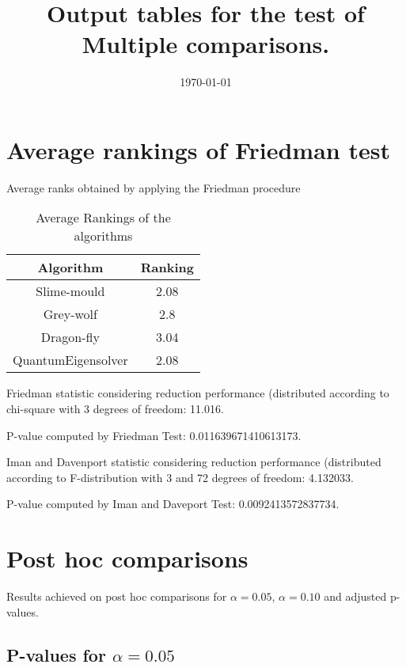 \documentclass[a4paper,10pt]{article}
\title{Output tables for the test of Multiple comparisons.}
\author{}
\date{\today}
\begin{document}
\begin{landscape}
\pagestyle{empty}
\maketitle
\thispagestyle{empty}
\section{Average rankings of Friedman test}



Average ranks obtained by applying the Friedman procedure

\begin{table}[!htp]
\centering
\begin{tabular}{|c|c|}\hline
Algorithm&Ranking\\\hline
Slime-mould & 2.08\\
Grey-wolf & 2.8\\
Dragon-fly & 3.04\\
QuantumEigensolver & 2.08\\
\hline
\end{tabular}
\caption{Average Rankings of the algorithms}
\end{table}

Friedman statistic considering reduction performance (distributed according to chi-square with 3 degrees of freedom: 11.016.

P-value computed by Friedman Test: 0.011639671410613173.\newline

Iman and Davenport statistic considering reduction performance (distributed according to F-distribution with 3 and 72 degrees of freedom: 4.132033.

P-value computed by Iman and Daveport Test: 0.0092413572837734.\newline



\pagebreak

\section{Post hoc comparisons}

Results achieved on post hoc comparisons for $\alpha = 0.05$, $\alpha = 0.10$ and adjusted p-values.

\subsection{P-values for $\alpha=0.05$}


\end{landscape}
\end{document}
